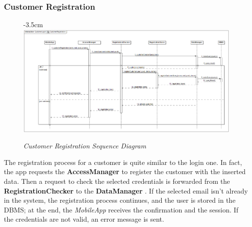 \documentclass{article}
\begin{document}
	\subsubsection{Customer Registration}
		\begin{figure}[H]
		\begin{adjustwidth} {-3.5cm}{}
			\centering
			\includegraphics[scale=0.4]{Sequence Diagrams/sd__CustomerLogin__CustomerRegistration.png}
		\end{adjustwidth}
		\caption{\emph{Customer Registration Sequence Diagram}}
	\end{figure}
	
	The registration process for a customer is quite similar to the login one. In fact, the app requests the {\bfseries AccessManager} to register the customer with the inserted data. Then a request to check the selected credentials is forwarded from the {\bfseries RegistrationChecker} to the {\bfseries DataManager} . If the selected email isn't already in the system, the registration process continues, and the user is stored in the DBMS; at the end, the \emph{MobileApp} receives the confirmation and the session. If the credentials are not valid, an error message is sent.
	
\end{document}
